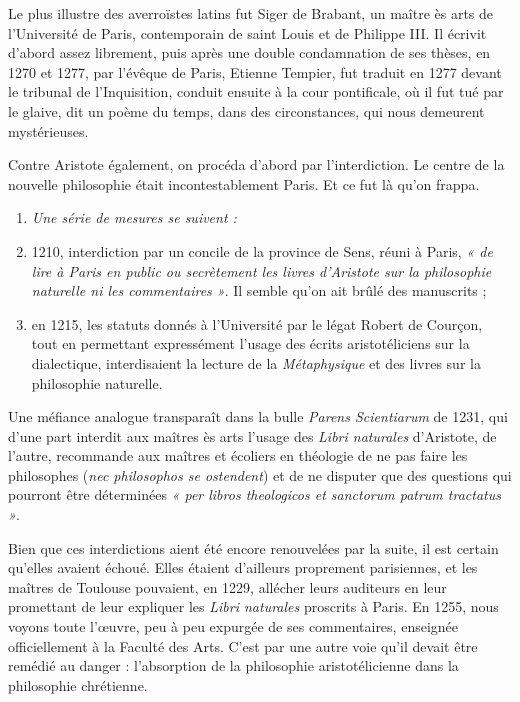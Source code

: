 \documentclass[french,twoside]{book} %
\newlength{\listmod}
\newcommand{\listhead}[1]{\hspace{-1\listmod}\emph{#1}}
\begin{document}
\begin{listalpha}[itemsep=\baselineskip,]
\item Le plus illustre des averroïstes latins fut Siger de Brabant, un maître ès arts de l’Université de Paris, contemporain de saint Louis et de Philippe III. Il écrivit d’abord assez librement, puis après une double condamnation de ses thèses, en 1270 et 1277, par l’évêque de Paris, Etienne Tempier, fut traduit en 1277 devant le tribunal de l’Inquisition, conduit ensuite à la cour pontificale, où il fut tué par le glaive, dit un poème du temps, dans des circonstances, qui nous demeurent mystérieuses.
\label{p120}\item Contre Aristote également, on procéda d’abord par l’interdiction. Le centre de la nouvelle philosophie était incontestablement Paris. Et ce fut là qu’on frappa.\par

\begin{enumerate}[itemsep=0pt,]
\item[]\listhead{Une série de mesures se suivent :}
\item  1210, interdiction par un concile de la province de Sens, réuni à Paris, \emph{« de lire à Paris en public ou secrètement les livres d’Aristote sur la philosophie naturelle ni les commentaires »}. Il semble qu’on ait brûlé des manuscrits ;
\item en 1215, les statuts donnés à l’Université par le légat Robert de Courçon, tout en permettant expressément l’usage des écrits aristotéliciens sur la dialectique, interdisaient la lecture de la {\itshape Métaphysique} et des livres sur la philosophie naturelle.

\end{enumerate}Une méfiance analogue transparaît dans la bulle {\itshape Parens Scientiarum} de 1231, qui d’une part interdit aux maîtres ès arts l’usage des {\itshape Libri naturales} d’Aristote, de l’autre, recommande aux maîtres et écoliers en théologie de ne pas faire les philosophes ({\itshape nec philosophos se ostendent}) et de ne disputer que des questions qui pourront être déterminées \emph{« per libros theologicos et sanctorum patrum tractatus »}.


\end{listalpha}\noindent Bien que ces interdictions aient été encore renouvelées par la suite, il est certain qu’elles avaient échoué. Elles étaient d’ailleurs proprement parisiennes, et les maîtres de Toulouse pouvaient, en 1229, allécher leurs auditeurs en leur promettant de leur expliquer les {\itshape Libri naturales} proscrits à Paris. En 1255, nous voyons toute l’œuvre, peu à peu expurgée de ses commentaires, enseignée officiellement à la Faculté des Arts. C’est par une autre voie qu’il devait être remédié au danger : l’absorption de la philosophie aristotélicienne dans la philosophie chrétienne.\par
\end{document}
